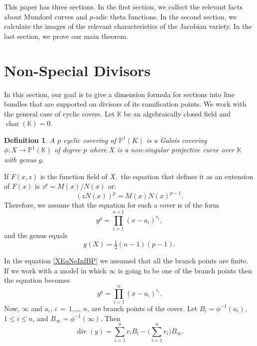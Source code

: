 \documentclass[]{amsart}
\numberwithin{equation}{section}
\newtheorem{definition}{Definition}[section]
\DeclareMathOperator{\charOp}{char}
\DeclareMathOperator{\divOp}{div}
\begin{document}
This paper  has  three sections. In the first section, we collect the relevant facts about Mumford curves and $p$-adic theta functions. In the second section, we calculate the images of the relevant characteristics of the Jacobian variety. 
In the last section, we prove our main theorem.

\section{Non-Special Divisors }
In this section, our goal is to give a dimension formula for  sections into line bundles that are supported on divisors of its ramification points. We work with the general case of cyclic covers. 
Let $\mathbb{K}$ be an algebraically closed field and $\charOp (\mathbb{K})=0$.
\begin{definition}\label{cycliccover}
A $p$ cyclic covering of $\mathbb{P}^{1}(K)$ is a Galois covering 
$\phi: X \to \mathbb{P}^{1}(\mathbb{K})$ of degree $p$ where $X$ 
is a non-singular projective curve over $\mathbb{K}$ with genus $g$.
\end{definition}
If $F(x,z)$ is the function field of $X,$ the equation that defines it as an extension of  $F(x)$ is
$z^p= M(x)/N(x)$  or: 
\begin{equation}
(zN(x))^p=M(x)N(x)^{p-1}.
\end{equation}
Therefore, we assume that the equation for such a cover is of the form
\begin{equation}\label{XEqNoInfBP}
y^p=\prod_{i=1}^{n+1}(x-a_i)^{r_i},
\end{equation}
and the genus equals 
$$g(X)= \tfrac{1}{2} (n-1)(p-1).$$ 

In the equation \eqref{XEqNoInfBP} we assumed that all the branch points are finite. 
If we  work with a model in which $\infty$ is going to be one of the branch points then the equation becomes 
\begin{equation}
y^p=\prod_{i=1}^{n}(x-a_i)^{r_i}.
\end{equation}
Now, $\infty$ and $a_i$, $i\,{=}\,1$,\ldots, $n$, are branch points of the cover. 
Let $B_i=\phi^{-1}(a_i)$, $1\leq i\leq n$, and $B_{\infty}=\phi^{-1}(\infty)$. Then
$$\divOp(y)=\sum_{i=1}^{n}r_i B_i- \bigg(\sum_{i=1}^{n} r_i \bigg)B_{\infty}.$$
\end{document}

